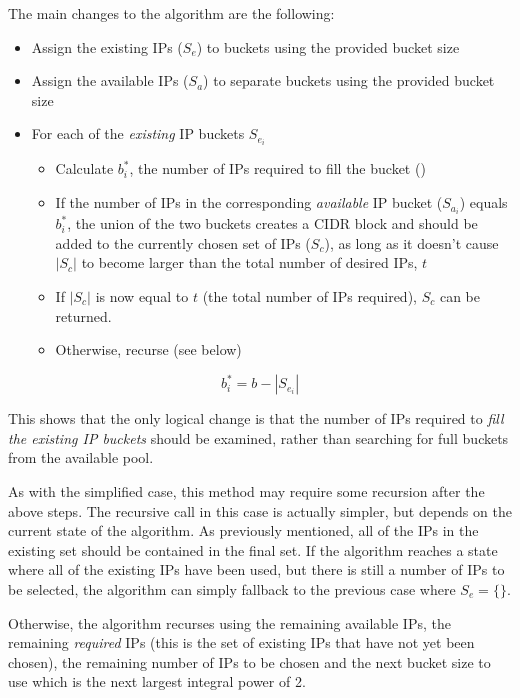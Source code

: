 The main changes to the algorithm are the following:

\begin{itemize}
  \item{Assign the existing IPs ($S_e$) to buckets using the provided bucket size}
  \item{Assign the available IPs ($S_a$) to separate buckets using the provided bucket size}
  \item{For each of the \textit{existing} IP buckets $S_{e_i}$}
      \begin{itemize}
      \item{Calculate $b^*_i$, the number of IPs required to fill the bucket ()}
      \item{If the number of IPs in the corresponding \textit{available} IP bucket ($S_{a_i}$) equals $b^*_i$, the union of the two buckets creates a CIDR block and should be added to the currently chosen set of IPs ($S_c$), as long as it doesn't cause $|S_c|$ to become larger than the total number of desired IPs, $t$}
      \item{If $|S_c|$ is now equal to $t$ (the total number of IPs required), $S_c$ can be returned.}
      \item{Otherwise, recurse (see below)}
      \end{itemize}
\end{itemize}


\begin{equation}\label{eq:ipsToFillBucket}
b^*_i= b-|S_{e_i}|
\end{equation}


This shows that the only logical change is that the number of IPs required to \textit{fill the existing IP buckets} should be examined, rather than searching for full buckets from the available pool. 

As with the simplified case, this method may require some recursion after the above steps. The recursive call in this case is actually simpler, but depends on the current state of the algorithm. As previously mentioned, all of the IPs in the existing set should be contained in the final set. If the algorithm reaches a state where all of the existing IPs have been used, but there is still a number of IPs to be selected, the algorithm can simply fallback to the previous case where $S_e = \{\}$. 

Otherwise, the algorithm recurses using the remaining available IPs, the remaining \textit{required} IPs (this is the set of existing IPs that have not yet been chosen), the remaining number of IPs to be chosen and the next bucket size to use which is the next largest integral power of 2.


